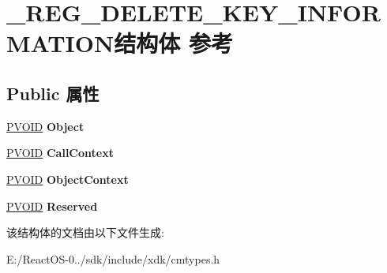 \hypertarget{struct___r_e_g___d_e_l_e_t_e___k_e_y___i_n_f_o_r_m_a_t_i_o_n}{}\section{\+\_\+\+R\+E\+G\+\_\+\+D\+E\+L\+E\+T\+E\+\_\+\+K\+E\+Y\+\_\+\+I\+N\+F\+O\+R\+M\+A\+T\+I\+O\+N结构体 参考}
\label{struct___r_e_g___d_e_l_e_t_e___k_e_y___i_n_f_o_r_m_a_t_i_o_n}
\subsection*{Public 属性}
\begin{DoxyCompactItemize}
\item 
\mbox{\label{struct___r_e_g___d_e_l_e_t_e___k_e_y___i_n_f_o_r_m_a_t_i_o_n_af2bfba482406ea41e7a98013fa96b9ba}} 
\hyperlink{interfacevoid}{P\+V\+O\+ID} {\bfseries Object}
\item 
\mbox{\label{struct___r_e_g___d_e_l_e_t_e___k_e_y___i_n_f_o_r_m_a_t_i_o_n_a121d62a88c2e0aabd473004e9a310e95}} 
\hyperlink{interfacevoid}{P\+V\+O\+ID} {\bfseries Call\+Context}
\item 
\mbox{\label{struct___r_e_g___d_e_l_e_t_e___k_e_y___i_n_f_o_r_m_a_t_i_o_n_a6a32be6fda0c647ff6d34e7a849e36ce}} 
\hyperlink{interfacevoid}{P\+V\+O\+ID} {\bfseries Object\+Context}
\item 
\mbox{\label{struct___r_e_g___d_e_l_e_t_e___k_e_y___i_n_f_o_r_m_a_t_i_o_n_a58886f7a3c4a5dbf464f0178728855ea}} 
\hyperlink{interfacevoid}{P\+V\+O\+ID} {\bfseries Reserved}
\end{DoxyCompactItemize}


该结构体的文档由以下文件生成\+:\begin{DoxyCompactItemize}
\item 
E\+:/\+React\+O\+S-\/0../sdk/include/xdk/cmtypes.\+h\end{DoxyCompactItemize}
